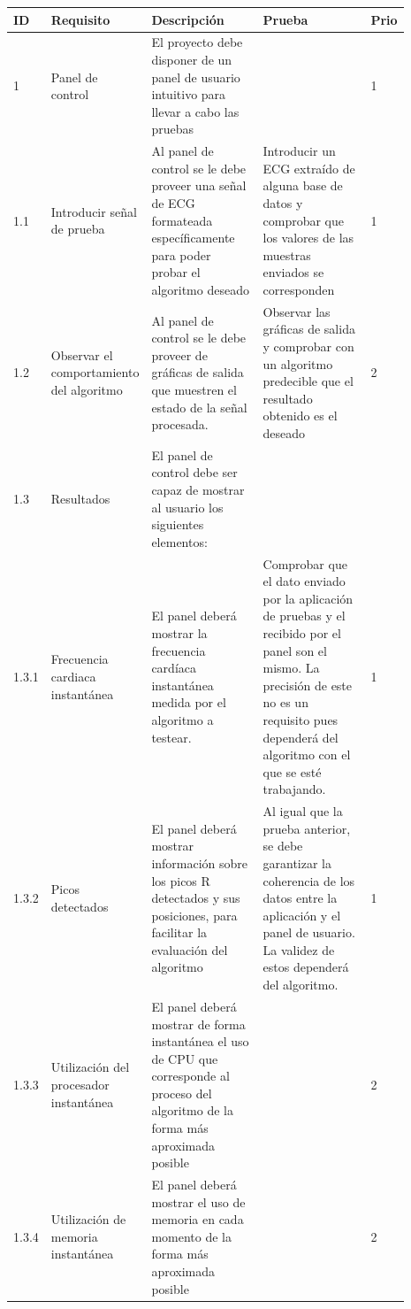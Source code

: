     \begin{scriptsize}
    \begin{longtable}{|p{0.05\linewidth}|p{0.21\linewidth}|p{0.3\linewidth}|p{0.3\linewidth}|p{0.03\linewidth}|}
        \hline
        ID & Requisito & Descripción & Prueba & Prio \\ \hline
        \endfirsthead
        \endhead
        \hline
        \endfoot
        \endlastfoot
        1 & Panel de control & El proyecto debe disponer de un panel de usuario intuitivo para llevar a cabo las pruebas &  & 1 \\ \hline
        1.1 & Introducir señal de prueba & Al panel de control se le debe proveer una señal de ECG formateada específicamente para poder probar el algoritmo deseado & Introducir un ECG extraído de alguna base de datos y comprobar que los valores de las muestras enviados se corresponden & 1 \\ \hline
        1.2     & Observar el comportamiento del algoritmo & Al panel de control se le debe proveer de gráficas de salida que muestren el estado de la señal procesada. & Observar las gráficas de salida y comprobar con un algoritmo predecible que el resultado obtenido es el deseado & 2 \\ \hline 
        1.3     & Resultados & El panel de control debe ser capaz de mostrar al usuario los siguientes elementos: &  &  \\ \hline
        1.3.1   & Frecuencia cardiaca instantánea & El panel deberá mostrar la frecuencia cardíaca instantánea medida por el algoritmo a testear. & Comprobar que el dato enviado por la aplicación de pruebas y el recibido por el panel son el mismo. La precisión de este no es un requisito pues dependerá del algoritmo con el que se esté trabajando. & 1 \\ \hline
        1.3.2   & Picos detectados & El panel deberá mostrar información sobre los picos R detectados y sus posiciones, para facilitar la evaluación del algoritmo & Al igual que la prueba anterior, se debe garantizar la coherencia de los datos entre la aplicación y el panel de usuario. La validez de estos dependerá del algoritmo. & 1 \\ \hline
        1.3.3   & Utilización del procesador instantánea & El panel deberá mostrar de forma instantánea el uso de CPU que corresponde al proceso del algoritmo de la forma más aproximada posible &  & 2 \\ \hline
        1.3.4   & Utilización de memoria instantánea & El panel deberá mostrar el uso de memoria en cada momento de la forma más aproximada posible &  & 2 \\ \hline

\end{longtable}
\end{scriptsize}
